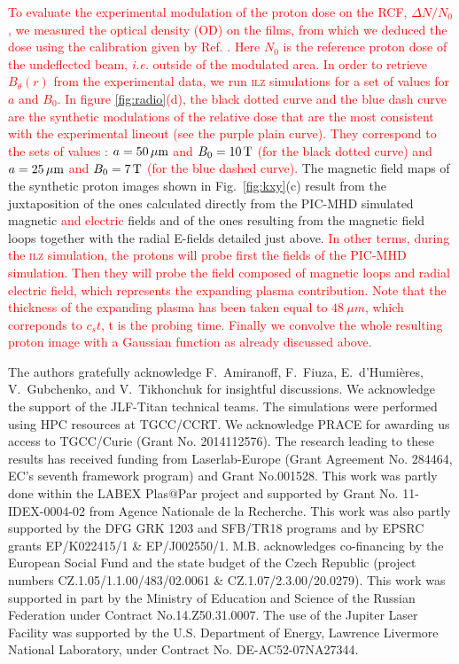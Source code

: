 \documentclass[aps,twocolumn,showpacs,superscriptaddress]{revtex4}
\begin{document}
\textcolor{red}{
To evaluate the experimental modulation of the proton dose on the RCF, $\Delta N/N_0$, we measured the optical density (OD) on the films, from which we deduced the dose using the calibration given by Ref. \cite{RSI_Chen_2016}. Here $N_0$ is the reference proton dose of the undeflected beam, \emph{i.e.} outside of the modulated area. In order to retrieve  $B_\theta(r)$ from the experimental data, we run \textsc{ilz} simulations for a set of values for $a$ and $B_0$. In figure \ref{fig:radio}(d), the black dotted curve and the blue dash curve are the synthetic modulations of the relative dose that are the most consistent with the experimental lineout (see the purple plain curve). They correspond to the  sets of values : $a=50\,\rm \mu m$ and $B_0=10\,\rm T$ (for the black dotted curve) and $a=25\,\rm \mu m$ and $B_0=7\,\rm T$ (for the blue dashed curve).
}
The magnetic field maps of the synthetic proton images shown in Fig.~\ref{fig:kxy}(c) result from the juxtaposition of the ones calculated directly from the PIC-MHD simulated magnetic \textcolor{red}{and electric} fields and of the ones resulting from the magnetic field loops together with the radial E-fields detailed just above. 
\textcolor{red}{
In other terms, during the \textsc{ilz} simulation, the protons will probe first the fields of the PIC-MHD simulation. Then they will probe the field composed of magnetic loops and \textcolor{red}{radial electric field}, which represents the expanding plasma contribution. \textcolor{red}{Note that the thickness of the expanding plasma has been taken equal to $ 48 \ \mu m $, which correponds to $c_s t $, t is the probing time}. Finally we convolve the whole resulting proton image with a Gaussian function as already discussed above. 
}

\begin{acknowledgments}
The authors gratefully acknowledge F.~Amiranoff, F.~Fiuza, E.~d'Humi\`eres, V.~Gubchenko, and V.~Tikhonchuk for insightful discussions.
We acknowledge the support of the JLF-Titan technical teams.
The simulations were performed using HPC resources at TGCC/CCRT. We acknowledge PRACE for awarding us access to TGCC/Curie (Grant No. 2014112576).
The research leading to these results has received funding from Laserlab-Europe (Grant Agreement No. 284464, EC's seventh framework program) and Grant No.001528. 
This work was partly done within the LABEX Plas$@$Par project and supported by Grant No. 11-IDEX-0004-02 from Agence Nationale de la Recherche. 
This work was also partly supported by the DFG GRK 1203 and SFB/TR18 programs and by EPSRC grants EP/K022415/1 \& EP/J002550/1. M.B. acknowledges co-financing by the European Social Fund and the state budget of the Czech Republic (project numbers CZ.1.05/1.1.00/483/02.0061 \& CZ.1.07/2.3.00/20.0279). 
This work was supported in part by the Ministry of Education and Science of the Russian Federation under Contract No.14.Z50.31.0007.
The use of the Jupiter Laser Facility  was supported by the U.S. Department of Energy, Lawrence Livermore  National Laboratory, under Contract No. DE-AC52-07NA27344.
\end{acknowledgments}
\end{document}
